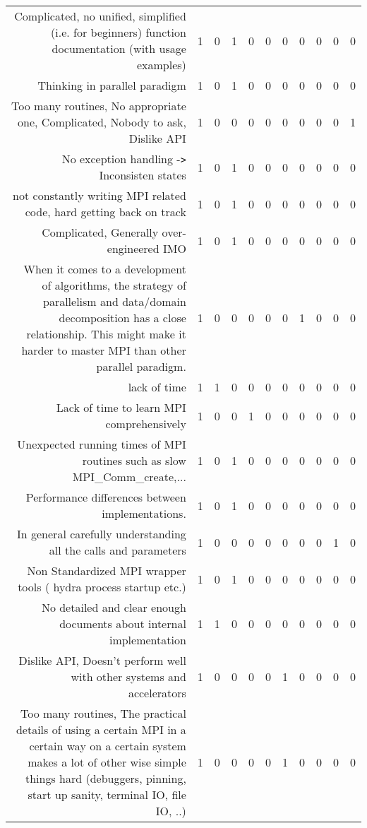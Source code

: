 {\begin{landscape}
\begin{longtable}[htb]{r|c|c|c|c|c|c|c|c|c|c}
{Complicated, no unified, simplified (i.e. for beginners) function documentation (with usage examples)} & 1 & 0 & 1 & 0 & 0 & 0 & 0 & 0 & 0 & 0 \\%
{Thinking in parallel paradigm} & 1 & 0 & 1 & 0 & 0 & 0 & 0 & 0 & 0 & 0 \\%
{Too many routines, No appropriate one, Complicated, Nobody to ask, Dislike API} & 1 & 0 & 0 & 0 & 0 & 0 & 0 & 0 & 0 & 1 \\%
{No exception handling -\verb!>! Inconsisten states} & 1 & 0 & 1 & 0 & 0 & 0 & 0 & 0 & 0 & 0 \\%
{not constantly writing MPI related code, hard getting back on track} & 1 & 0 & 1 & 0 & 0 & 0 & 0 & 0 & 0 & 0 \\%
{Complicated, Generally over-engineered IMO} & 1 & 0 & 1 & 0 & 0 & 0 & 0 & 0 & 0 & 0 \\%
{When it comes to a development of algorithms, the strategy of parallelism and  data/domain decomposition has a close relationship. This might make it harder to master MPI than other parallel paradigm.} & 1 & 0 & 0 & 0 & 0 & 0 & 1 & 0 & 0 & 0 \\%
{lack of time} & 1 & 1 & 0 & 0 & 0 & 0 & 0 & 0 & 0 & 0 \\%
{Lack of time to learn MPI comprehensively} & 1 & 0 & 0 & 1 & 0 & 0 & 0 & 0 & 0 & 0 \\%
{Unexpected running times of MPI routines such as slow MPI\_Comm\_create,...} & 1 & 0 & 1 & 0 & 0 & 0 & 0 & 0 & 0 & 0 \\%
{Performance differences between implementations.} & 1 & 0 & 1 & 0 & 0 & 0 & 0 & 0 & 0 & 0 \\%
{In general carefully understanding all the calls and parameters} & 1 & 0 & 0 & 0 & 0 & 0 & 0 & 0 & 1 & 0 \\%
{Non  Standardized MPI wrapper tools ( hydra process startup etc.)} & 1 & 0 & 1 & 0 & 0 & 0 & 0 & 0 & 0 & 0 \\%
{No detailed and clear enough documents about internal implementation} & 1 & 1 & 0 & 0 & 0 & 0 & 0 & 0 & 0 & 0 \\%
{Dislike API, Doesn't perform well with other systems and accelerators} & 1 & 0 & 0 & 0 & 0 & 1 & 0 & 0 & 0 & 0 \\%
{Too many routines, The practical details of using a certain MPI in a certain way on a certain system makes a lot of other wise simple things hard (debuggers, pinning, start up sanity, terminal IO, file IO, ..)} & 1 & 0 & 0 & 0 & 0 & 1 & 0 & 0 & 0 & 0 \\%

\end{longtable}
\end{landscape}}
